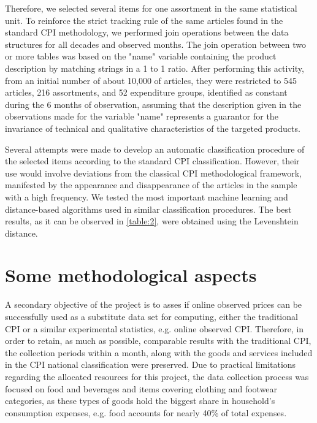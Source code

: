 \documentclass[]{article}
\begin{document}
Therefore, we selected several items for one assortment in the same statistical unit. To reinforce the strict tracking 
rule of the same articles found in the standard CPI methodology, we performed join operations between the data structures 
for all decades and observed months. The join operation between two or more tables was based on the "name" variable containing 
the product description by matching strings in a 1 to 1 ratio. After performing this activity, from an initial number 
of about 10,000 of articles, they were restricted to 545 articles, 216 assortments, and 52 expenditure groups, 
identified as constant during the 6 months of observation, assuming that the description given in the observations 
made for the variable "name" represents a guarantor for the invariance of technical and qualitative characteristics of the targeted products.


Several attempts were made to develop an automatic classification procedure of the selected items according to the standard CPI classification. 
However, their use would involve deviations from the classical CPI methodological framework, manifested by the appearance and disappearance 
of the articles in the sample with a high frequency. We tested the most important machine learning and distance-based algorithms 
used in similar classification procedures. The best results, as it can be observed in \ref{table:2}, were obtained using the Levenshtein distance.



\section{Some methodological aspects}\label{methodology}

A secondary objective of the project is to asses if online observed prices can be successfully
used as a substitute data set for computing, either the traditional CPI or a similar 
experimental statistics, e.g. online observed CPI. Therefore, in order to retain, 
as much as possible, comparable results with the traditional CPI, the collection periods 
within a month, along with the goods and services included in the CPI national classification 
were preserved. Due to practical limitations regarding the allocated resources for 
this project, the data collection process was focused on food and beverages and items 
covering clothing and footwear categories, as these types of goods hold the biggest share in 
household's consumption expenses, e.g. food accounts for nearly 40\% of total expenses\cite{hhs}. 
\end{document}
